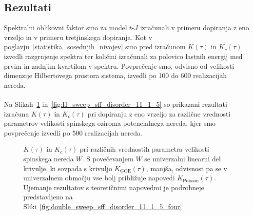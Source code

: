 \subsection{Rezultati}
Spektralni oblikovni faktor smo za model $t$-$J$ izračunali v primeru dopiranja z eno vrzeljo in v primeru tretjinskega dopiranja. Kot v poglavju~\ref{statistika_sosednjih_nivojev} smo pred izračunom $K(\tau)$ in $K_c(\tau)$ izvedli razgrnjenje spektra ter količini izračunali za polovico lastnih energij med prvim in zadnjim kvartilom v spektru. Povprečenje smo, odvisno od velikosti dimenzije Hilbertovega prostora sistema, izvedli po 100 do 600 realizacijah nereda. \\\\
Na Slikah~\ref{fig:W_sweep_sff_disorder_11_1_5} in~\ref{fig:H_sweep_sff_disorder_11_1_5}
so prikazani rezultati izračuna $K(\tau)$ in $K_c(\tau)$ pri dopiranju z eno vrzeljo za različne vrednosti parametrov velikosti spinskega oziroma potencialnega nereda, kjer smo povprečenje izvedli po 500 realizacijah nereda. 
 \begin{figure}[H]
\caption{$K(\tau)$ in $K_c(\tau)$ pri različnih vrednostih parametra velikosti spinskega nereda $W$. S povečevanjem $W$ se univerzalni linearni del krivulje, ki sovpada s krivuljo $K_\mathrm{GOE}(\tau)$, manjša, odvisnost pa se v univerzalnem območju vse bolj približuje napovedi $K_\mathrm{Poisson}(\tau).$ Ujemanje rezultatov s teoretičnimi napovedmi je podrobneje predstavljeno na Sliki~\ref{fig:double_sweep_sff_disorder_11_1_5_four}}
\label{fig:W_sweep_sff_disorder_11_1_5}
\end{figure}
